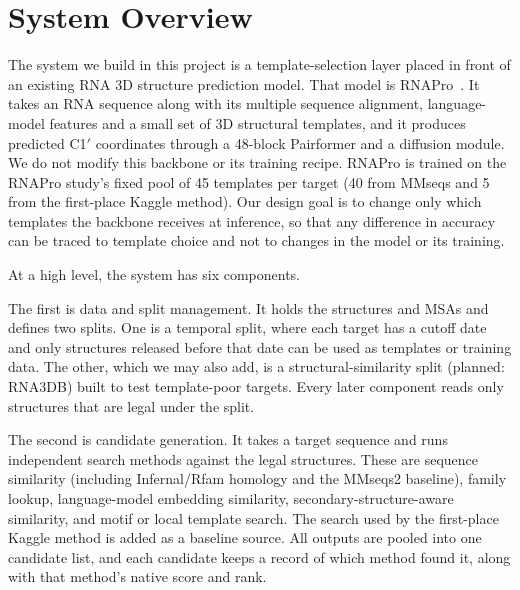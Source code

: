 \documentclass{FastFyp}
\begin{document}
\section{System Overview}
The system we build in this project is a template-selection layer placed in front of an existing RNA 3D structure prediction model. That model is RNAPro~\cite{leerna}. It takes an RNA sequence along with its multiple sequence alignment, language-model features and a small set of 3D structural templates, and it produces predicted C1$'$ coordinates through a 48-block Pairformer and a diffusion module. We do not modify this backbone or its training recipe. RNAPro is trained on the RNAPro study's fixed pool of 45 templates per target (40 from MMseqs and 5 from the first-place Kaggle method). Our design goal is to change only which templates the backbone receives at inference, so that any difference in accuracy can be traced to template choice and not to changes in the model or its training.

At a high level, the system has six components.

The first is data and split management. It holds the structures and MSAs and defines two splits. One is a temporal split, where each target has a cutoff date and only structures released before that date can be used as templates or training data. The other, which we may also add, is a structural-similarity split (planned: RNA3DB) built to test template-poor targets. Every later component reads only structures that are legal under the split.

The second is candidate generation. It takes a target sequence and runs independent search methods against the legal structures. These are sequence similarity (including Infernal/Rfam homology and the MMseqs2 baseline), family lookup, language-model embedding similarity, secondary-structure-aware similarity, and motif or local template search. The search used by the first-place Kaggle method is added as a baseline source. All outputs are pooled into one candidate list, and each candidate keeps a record of which method found it, along with that method's native score and rank.
\end{document}
